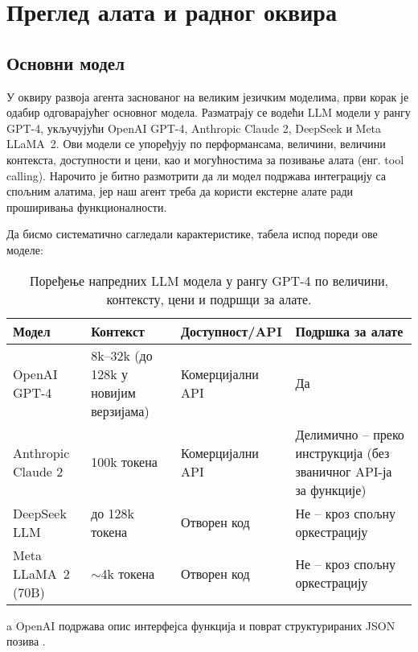\chapter{Преглед алата и радног оквира}
\label{sec:llm_agent}

\section{Основни модел}

У оквиру развоја агента заснованог на великим језичким моделима, први корак је одабир одговарајућег основног модела. Разматрају се водећи LLM модели у рангу GPT-4, укључујући OpenAI GPT-4, Anthropic Claude 2, DeepSeek и Meta LLaMA~2. Ови модели се упоређују по перформансама, величини, величини контекста, доступности и цени, као и могућностима за позивање алата (енг. tool calling). Нарочито је битно размотрити да ли модел подржава интеграцију са спољним алатима, јер наш агент треба да користи екстерне алате ради проширивања функционалности.

Да бисмо систематично сагледали карактеристике, табела испод пореди ове моделе:

\begin{table}[h]
\centering
\footnotesize
\begin{threeparttable}
\begin{tabular}{|m{3.5cm}|m{3.0cm}|m{3.8cm}|m{4.2cm}|}
\hline
    \textbf{Модел} & \textbf{Контекст} & \textbf{Доступност/API} & \textbf{Подршка за алате} \\
\hline
OpenAI GPT-4 & 8k--32k (до 128k у новијим верзијама) & Комерцијални API & Да\tnote{a} \\
\hline
Anthropic Claude 2 & 100k токена & Комерцијални API & Делимично -- преко инструкција (без званичног API-ја за функције) \\
\hline
DeepSeek LLM & до 128k токена & Отворен код & Не -- кроз спољну оркестрацију \\
\hline
Meta LLaMA~2 (70B) & \(\sim\)4k токена & Отворен код & Не -- кроз спољну оркестрацију \\
\hline
\end{tabular}
\begin{tablenotes}
\item[a] OpenAI подржава опис интерфејса функција и поврат структурираних JSON позива \cite{openai_function_calling_2023}.
\end{tablenotes}
\end{threeparttable}
\caption{Поређење напредних LLM модела у рангу GPT-4 по величини, контексту, цени и подршци за алате.}
\label{tab:llm_comparison}
\end{table}


